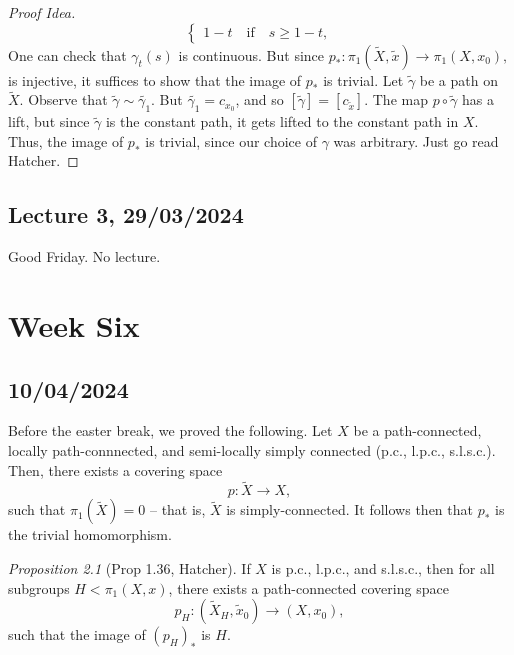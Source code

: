 \documentclass[a4paper]{report}
\theoremstyle{definition}
\theoremstyle{remark}
\theoremstyle{proposition}
\newtheorem{proposition}{Proposition}
\theoremstyle{conjecture}
\theoremstyle{lemma}
\theoremstyle{corollary}
\theoremstyle{exercise}
\begin{document}
\begin{proof}[Proof Idea]
$$\begin{cases}
        1-t \quad \text{if} \quad s\geq 1-t,
    \end{cases}$$
    One can check that $\gamma_t(s)$ is continuous.
    But since $p_\ast : \pi_1(\widetilde{X},\widetilde{x}) \to \pi_1(X,x_0),$ is injective,
    it suffices to show that the image of $p_\ast$ is trivial.
    Let $\widetilde{\gamma}$ be a path on $\widetilde{X}$. Observe that $\widetilde{\gamma} \sim \widetilde{\gamma_1}$.
    But $\widetilde{\gamma_1} = c_{x_0}$, and so $[\widetilde{\gamma}] = [c_{\widetilde{x}}]$.
    The map $p\circ \widetilde{\gamma}$ has a lift, but since $\widetilde{\gamma}$ is the constant 
    path, it gets lifted to the constant path in $X$. Thus, the image of $p_\ast$ is trivial, since our choice of 
    $\gamma$ was arbitrary. Just go read Hatcher.
\end{proof}

\section{Lecture 3, 29/03/2024}

Good Friday. No lecture.

\chapter{Week Six}

\section{10/04/2024}

Before the easter break, we proved the following.
Let $X$ be a path-connected, locally path-connnected, and semi-locally simply connected 
(p.c., l.p.c., s.l.s.c.).
Then, there exists a covering space $$p  : \widetilde{X} \longrightarrow X,$$ 
such that $\pi_1(\widetilde{X}) = 0$ -- that is, $\widetilde{X}$ is simply-connected.
It follows then that $p_\ast$ is the trivial homomorphism.

\begin{proposition}[Prop 1.36, Hatcher]
    If $X$ is p.c., l.p.c., and s.l.s.c., then for all subgroups $H < \pi_1(X,x)$, 
    there exists a path-connected covering space 
    $$p_H : (\widetilde{X}_H, \widetilde{x}_0) \longrightarrow (X,x_0),$$
    such that the image of $(p_H)_\ast$ is $H$.
\end{proposition}
\end{document}
